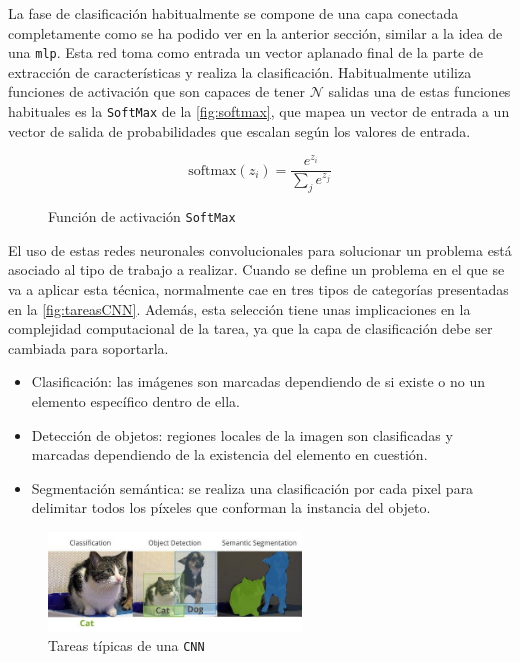 La fase de clasificación habitualmente se compone de una capa conectada completamente como se ha podido ver en la anterior sección, similar a la idea de una \texttt{\acrshort{mlp}}. Esta 
red toma como entrada un vector aplanado final de la parte de extracción de características y realiza la clasificación. Habitualmente utiliza funciones de activación que son capaces de tener \(\mathcal{N}\) salidas 
una de estas funciones habituales es la \texttt{SoftMax} de la \autoref{fig:softmax}, que mapea un vector de entrada a un vector de salida de probabilidades que escalan según los valores de entrada.

\begin{figure}[H]
    \centering
    \begin{equation*}
        \text{softmax}(z_i) = \frac{e^{z_i}}{\sum_j e^{z_j}}
    \end{equation*}
    \caption{Función de activación \texttt{SoftMax}}
    \label{fig:softmax}
\end{figure}

\vspace{3\baselineskip}

El uso de estas redes neuronales convolucionales para solucionar un problema está asociado al tipo de trabajo a realizar. Cuando se define un problema en el que se va a aplicar esta técnica, normalmente 
cae en tres tipos de categorías presentadas en la \autoref{fig:tareasCNN}. Además, esta selección tiene unas implicaciones en la complejidad computacional de la tarea, ya que la capa de clasificación debe ser cambiada para soportarla.

\begin{itemize}
    \item Clasificación: las imágenes son marcadas dependiendo de si existe o no un elemento específico dentro de ella.
    \item Detección de objetos: regiones locales de la imagen son clasificadas y marcadas dependiendo de la existencia del elemento en cuestión.
    \item Segmentación semántica: se realiza una clasificación por cada pixel para delimitar todos los píxeles que conforman la instancia del objeto.
\end{itemize}

\begin{figure}[H]
    \centering
    \includegraphics[width=0.6\textwidth]{images/4/TiposTareas.png}
    \caption{Tareas típicas de una \texttt{CNN}\cite{kallfelzsirmacekSEQUENTIALIMAGEPROCESSING2019}}
    \label{fig:tareasCNN}
\end{figure}

